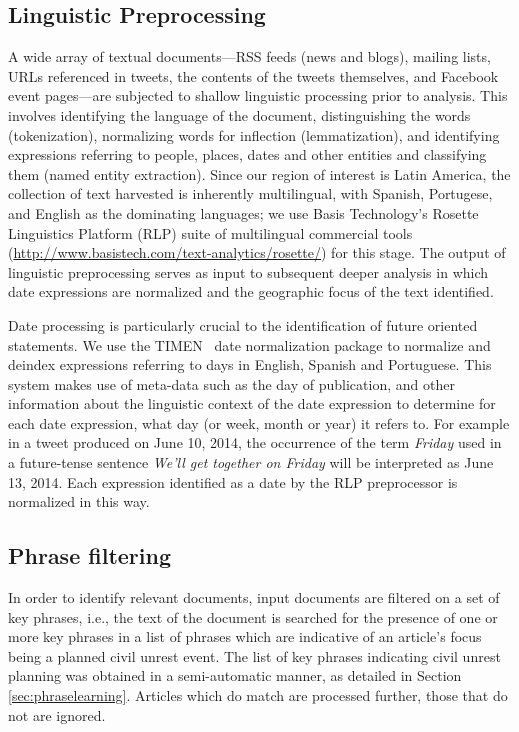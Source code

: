 \documentclass[letterpaper]{article}
\begin{document}
\subsection{Linguistic Preprocessing}
A wide array of textual documents---RSS feeds (news and blogs),
mailing lists, URLs referenced in tweets, the contents of the tweets themselves,
and Facebook event pages---are
subjected to shallow linguistic processing prior to analysis.  This
involves identifying the language of the document, distinguishing
the words (tokenization), normalizing words for inflection
(lemmatization), and identifying expressions referring to people,
places, dates and other entities and classifying them (named entity extraction). 
Since our region of interest is Latin America, the collection of text
harvested is inherently multilingual, with Spanish, Portugese, and English as
the dominating languages;
we use Basis Technology's Rosette Linguistics Platform (RLP) suite of multilingual commercial tools (\url{http://www.basistech.com/text-analytics/rosette/}) for this stage.
The output of linguistic preprocessing serves as input to subsequent deeper analysis in which 
date expressions are normalized and the geographic focus of the text identified.

Date processing is particularly crucial to the identification of
future oriented statements. We use the TIMEN~\cite{LlorensDGS12} date
normalization package to normalize and deindex expressions referring
to days in English, Spanish and Portuguese. This system makes use of
meta-data such as the day of publication, and other information about
the linguistic context of the date expression to determine for each
date expression, what day (or week, month or year) it refers to.  For
example in a tweet produced on June 10, 2014, the occurrence of the
term {\em Friday} used in a future-tense sentence {\em We'll get
  together on Friday} will be interpreted as June 13, 2014.  Each
expression identified as a date by the RLP preprocessor is normalized
in this way.

\subsection{Phrase filtering}
In order to identify relevant documents, input documents are filtered on a set of key phrases, i.e.,
the text of the document is searched for the presence of one or
more key phrases in a list of phrases which are indicative of an article's focus being
a planned civil unrest event.  
The list of key phrases indicating civil unrest planning was obtained
in a semi-automatic manner, as detailed in Section \ref{sec:phraselearning}.
Articles which do match are processed further, those that do not are ignored.
\end{document}
